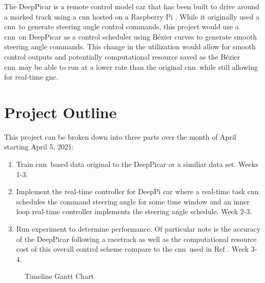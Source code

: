 \documentclass[12pt]{report}
\newcommand{\CNN}{\acrshort{cnn}}
\newcommand{\GNC}{\acrshort{gnc}}
\begin{document}
The DeepPicar is a remote control model car that has been built to drive around a marked track using a \acrfull{cnn} hosted on a Raspberry Pi \cite{bechtel2018}. While it originally used a \CNN\ to generate steering angle control commands, this project would use a \CNN\ on DeepPicar as a control scheduler using B\'ezier curves to generate smooth steering angle commands. This change in the utilization would allow for smooth control outputs and potentially computational resource saved as the B\'ezier \CNN\ may be able to run at a lower rate than the original \CNN\ while still allowing for real-time \GNC .

\chapter{Project Outline}

This project can be broken down into three parts over the month of April starting April 5, 2021:

\begin{enumerate}[label=Part \arabic*), leftmargin=16ex]
\item Train \CNN\ based data original to the DeepPicar \citep{bechtel2018} or a similiar data set. Weeks 1-3.
\item Implement the real-time controller for DeepPi car where a real-time task \acrfull{cnn} schedules the command steering angle for some time window and an inner loop real-time controller implements the steering angle schedule. Week 2-3.
\item Run experiment to determine performance. Of particular note is the accuracy of the DeepPicar following a racetrack as well as the computational resource cost of this overall control scheme compare to the \CNN\ used in Ref \citep{bechtel2018}. Week 3-4.
\end{enumerate}

\begin{figure}[htb]
\begin{center}
\end{center}
\caption{Timeline Gantt Chart}
\end{figure}
\end{document}
